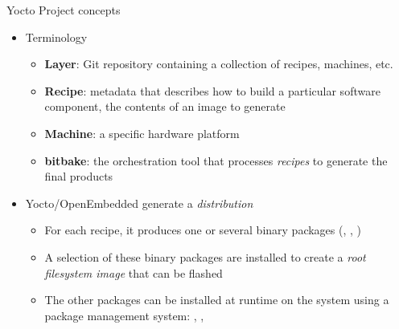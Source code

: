 \begin{frame}{Yocto Project concepts}
  \begin{itemize}
  \item Terminology
    \begin{itemize}
    \item {\bf Layer}: Git repository containing a collection of
      recipes, machines, etc.
    \item {\bf Recipe}: metadata that describes how to build a
      particular software component, the contents of an image to
      generate
    \item {\bf Machine}: a specific hardware platform
    \item {\bf bitbake}: the orchestration tool that processes {\em
        recipes} to generate the final products
    \end{itemize}
  \item Yocto/OpenEmbedded generate a {\em distribution}
    \begin{itemize}
    \item For each recipe, it produces one or several binary packages
      (, , )
    \item A selection of these binary packages are installed to create
      a {\em root filesystem image} that can be flashed
    \item The other packages can be installed at runtime on the system
      using a package management system: , ,
    \end{itemize}
  \end{itemize}
\end{frame}

